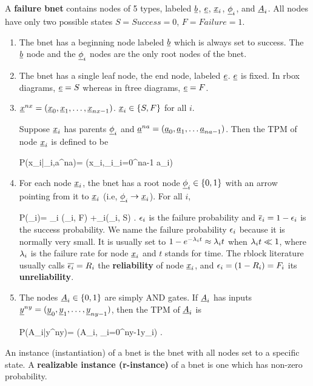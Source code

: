 A {\bf failure bnet} contains
nodes of 5  types,
labeled $\rvb$, $\rve$, $\rvx_i$,
$\ul{\phi}_i$, and $\rvA_i$.
All nodes have only
two possible states
$S=Success=0$, $F=Failure=1$.
\begin{enumerate}
\item 
The bnet has a beginning node labeled
$\rvb$ which is always set to success.
The $\rvb$ node
and the $\ul{\phi}_i$
nodes are the only root nodes of
the bnet.

\item The bnet has 
a single leaf node, the end node, labeled 
$\rve$. $\rve$ is fixed.
In rbox diagrams,
$\rve=S$
whereas in ftree diagrams, $\rve=F$.

\item
$\rvx^{nx}=
(\rvx_0, \rvx_1, \ldots, \rvx_{nx-1})$.
$\rvx_i\in \{S, F\}$ for all $i$.

Suppose $\rvx_i$
has parents 
$\ul{\phi}_i$ and $\rva^{na}=(\rva_0, \rva_1,
\dots \rva_{na-1})$.
Then the TPM of node $\rvx_i$ is
defined to be

 
\beq\color{blue}
P(x_i|\phi_i,a^{na})=
\delta(x_i,\phi_i\V  \V_{i=0}^{na-1} a_i)
\eeq

\item
For each node $\rvx_i$, the bnet has
 a 
 root node $\ul{\phi}_i\in \bool$
with an arrow
pointing from it 
to $\rvx_i$ (i.e, 
$\ul{\phi}_i\rarrow \rvx_i$).
For all $i$,

\beq \color{blue}
P(\phi_i)=
\eps_i \delta(\phi_i, F)
+\ol{\eps}_i\delta(\phi_i, S)
\;.
\eeq
$\epsilon_i$ is the failure probability
and $\overline{\epsilon}_i=1-\epsilon_i$
is the success probability.
We name the failure
probability $\epsilon_i$
because it
is normally very small.
It is usually
set to
$1-e^{-\lambda_it}\approx \lambda_it$
when $\lambda_it\ll 1$,
where $\lambda_i$
is the failure rate
for node $\rvx_i$
and $t$ stands for time.
The rblock
literature
usually calls 
$\overline{\epsilon_i}=R_i$
the {\bf reliability}
 of 
node $\rvx_i$,
and 
$\epsilon_i=(1-R_i)=F_i$
its {\bf unreliability}.


\item
The nodes $\rvA_i\in \bool$ 
are simply AND gates.
If $\rvA_i$ has inputs $\rvy^{ny}=
(\rvy_0, \rvy_1,
\ldots, \rvy_{ny-1})$,
then the TPM of $\rvA_i$ is

\beq\color{blue}
P(A_i|y^{ny})=
\delta(A_i, \A_{i=0}^{ny-1}y_i)
\;.
\eeq

\end{enumerate}

An instance (instantiation)
of a bnet is the bnet 
with all nodes set to
a specific state.
A {\bf realizable instance (r-instance)}
of a bnet is one
which has non-zero probability.

